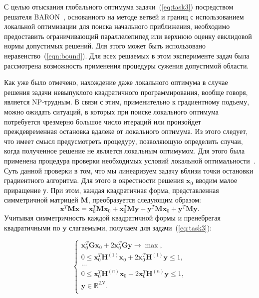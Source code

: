 С целью отыскания глобального оптимума задачи~(\ref{eq:task3}) посредством решателя BARON~\cite{tawarmalani:global}, основанного на методе ветвей и границ с использованием локальной оптимизации для поиска начального приближения, необходимо предоставить ограничивающий параллелепипед или верхнюю оценку евклидовой нормы допустимых решений. Для этого может быть использовано неравенство~(\ref{eqn:bound}). Для всех решаемых в этом эксперименте задач была рассмотрена возможность применения процедуры сужения допустимой области.

Как уже было отмечено, нахождение даже локального оптимума в случае решения задачи невыпуклого квадратичного программирования, вообще говоря, является NP-трудным. В связи с этим, применительно к градиентному подъему, можно ожидать ситуаций, в которых при поиске локального оптимума потребуется чрезмерно большое число итераций или произойдет преждевременная остановка вдалеке от локального оптимума. Из этого следует, что имеет смысл предусмотреть процедуру, позволяющую определить случаи, когда полученное решение не является локальным оптимумом. Для этого была применена процедура проверки необходимых условий локальной оптимальности~\cite{murty:np}. Суть данной проверки в том, что мы линеаризуем задачу вблизи точки остановки градиентного алгоритма. Для этого в окрестности решения $\textbf{x}_0$ вводим малое приращение $\textbf{у}$. При этом, каждая квадратичная форма, представленная симметричной матрицей $\textbf{M}$, преобразуется следующим образом:
$$\textbf{x}^T\textbf{M}\textbf{x} = \textbf{x}_0^T\textbf{M}\textbf{x}_0 +
\textbf{x}_0^T\textbf{M}\textbf{y} + \textbf{y}^T\textbf{M}\textbf{x}_0 +
\textbf{y}^T\textbf{M}\textbf{y}.$$ Учитывая симметричность каждой квадратичной формы и пренебрегая квадратичными по $\textbf{y}$ слагаемыми, получаем для задачи~(\ref{eq:task3}):


\begin{equation}
    \begin{cases}
       \textbf{x}_0^T\textbf{G}\textbf{x}_0 + 2\textbf{x}_0^T\textbf{G}\textbf{y} \rightarrow \max,\\
       0 \leq \textbf{x}_0^T\textbf{H}^{(1)}\textbf{x}_0 + 2\textbf{x}_0^T\textbf{H}^{(1)}\textbf{y} \leq 1,\\
       ...\\
       0 \leq \textbf{x}_0^T\textbf{H}^{(n)}\textbf{x}_0 + 2\textbf{x}_0^T\textbf{H}^{(n)}\textbf{y} \leq 1,\\
      \textbf{y} \in \mathbb{R}^{2N}.\\
     \end{cases}
     \label{eq:task5}
\end{equation}

